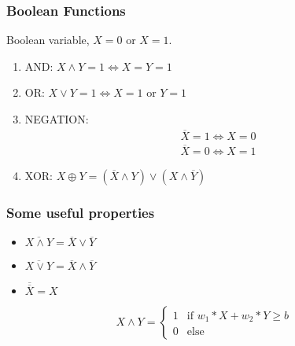 \documentclass[12pt,aspectratio=169]{beamer}
\begin{document}
\begin{frame}
  \frametitle{Boolean Functions}
  \begin{large}
    Boolean variable, $X=0$ or $X=1$.\pause
    \bigskip
    \begin{enumerate}
    \item AND: $X\wedge Y=1 \Leftrightarrow X=Y=1$ \pause

      \smallskip

    \item OR: $X\vee Y=1 \Leftrightarrow X=1$ or $Y=1$ \pause

      \smallskip

    \item NEGATION: 
      \begin{align*}
        &\overline{X}=1 \Leftrightarrow X=0\\
        &\overline{X}=0 \Leftrightarrow X=1
      \end{align*}
      \pause
       \smallskip
       
      \item XOR: $X \oplus Y=(\overline{X}\wedge Y)\vee (X \wedge \overline{Y})$
      
    \end{enumerate}
      \end{large}
\end{frame}

\begin{frame}
\frametitle{Some useful properties}
\begin{itemize}
\item $\overline{X\wedge Y}=\overline{X}\vee \overline{Y}$\pause
\bigskip
\item $\overline{X\vee Y}=\overline{X}\wedge \overline{Y}$\pause
\bigskip
\item $\overline{\overline{X}}=X$
\end{itemize}
\end{frame}

\begin{frame}

\begin{figure}
\end{figure}


\[
X \wedge Y=\left \{ \begin{array}{ll}
1 &\mbox{if }w_1*X+w_2*Y\geq b\\
0 &\mbox{else}
\end{array}
\right.
\]
\end{frame}
\end{document}
